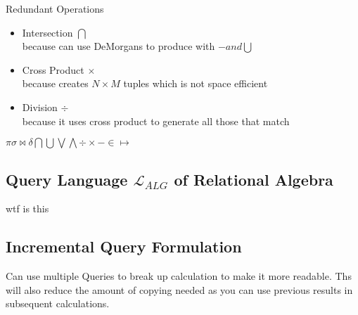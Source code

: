 \documentclass{article}
\newcommand\tab[1][0.5cm]{\hspace*{#1}}
\begin{document}
		Redundant Operations
		\begin{itemize}
			\item Intersection $\bigcap$
			\\ \tab because can use DeMorgans to produce with $- and \bigcup$

			\item Cross Product $\times$
			\\ \tab because creates $N\times M$ tuples which is not space efficient

			\item Division $\div$
			\\ \tab because it uses cross product to generate all those that match
		\end{itemize}

		$\pi \sigma \bowtie \delta \bigcap \bigcup \bigvee \bigwedge \div \times - \in \mapsto$

	\subsection{Query Language $\mathcal{L} _{ALG}$ of Relational Algebra}
		wtf is this

	\subsection{Incremental Query Formulation}
		Can use multiple Queries to break up calculation to make it more readable. Ths will also reduce the amount of copying needed as you can use previous results in subsequent calculations.

		
\end{document}
